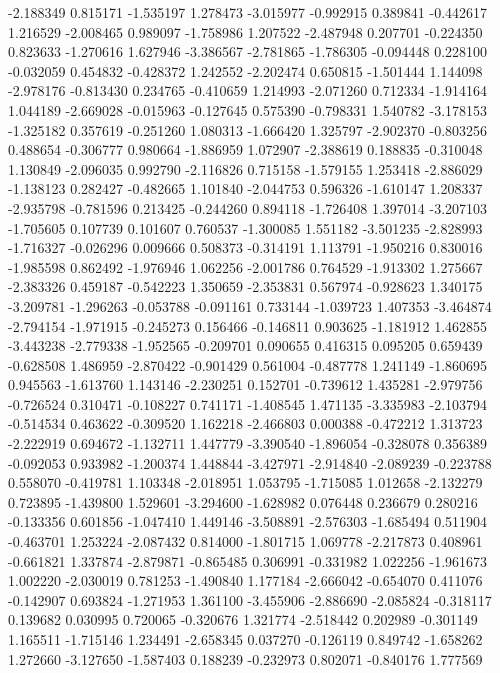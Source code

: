 -2.188349
0.815171
-1.535197
1.278473
-3.015977
-0.992915
0.389841
-0.442617
1.216529
-2.008465
0.989097
-1.758986
1.207522
-2.487948
0.207701
-0.224350
0.823633
-1.270616
1.627946
-3.386567
-2.781865
-1.786305
-0.094448
0.228100
-0.032059
0.454832
-0.428372
1.242552
-2.202474
0.650815
-1.501444
1.144098
-2.978176
-0.813430
0.234765
-0.410659
1.214993
-2.071260
0.712334
-1.914164
1.044189
-2.669028
-0.015963
-0.127645
0.575390
-0.798331
1.540782
-3.178153
-1.325182
0.357619
-0.251260
1.080313
-1.666420
1.325797
-2.902370
-0.803256
0.488654
-0.306777
0.980664
-1.886959
1.072907
-2.388619
0.188835
-0.310048
1.130849
-2.096035
0.992790
-2.116826
0.715158
-1.579155
1.253418
-2.886029
-1.138123
0.282427
-0.482665
1.101840
-2.044753
0.596326
-1.610147
1.208337
-2.935798
-0.781596
0.213425
-0.244260
0.894118
-1.726408
1.397014
-3.207103
-1.705605
0.107739
0.101607
0.760537
-1.300085
1.551182
-3.501235
-2.828993
-1.716327
-0.026296
0.009666
0.508373
-0.314191
1.113791
-1.950216
0.830016
-1.985598
0.862492
-1.976946
1.062256
-2.001786
0.764529
-1.913302
1.275667
-2.383326
0.459187
-0.542223
1.350659
-2.353831
0.567974
-0.928623
1.340175
-3.209781
-1.296263
-0.053788
-0.091161
0.733144
-1.039723
1.407353
-3.464874
-2.794154
-1.971915
-0.245273
0.156466
-0.146811
0.903625
-1.181912
1.462855
-3.443238
-2.779338
-1.952565
-0.209701
0.090655
0.416315
0.095205
0.659439
-0.628508
1.486959
-2.870422
-0.901429
0.561004
-0.487778
1.241149
-1.860695
0.945563
-1.613760
1.143146
-2.230251
0.152701
-0.739612
1.435281
-2.979756
-0.726524
0.310471
-0.108227
0.741171
-1.408545
1.471135
-3.335983
-2.103794
-0.514534
0.463622
-0.309520
1.162218
-2.466803
0.000388
-0.472212
1.313723
-2.222919
0.694672
-1.132711
1.447779
-3.390540
-1.896054
-0.328078
0.356389
-0.092053
0.933982
-1.200374
1.448844
-3.427971
-2.914840
-2.089239
-0.223788
0.558070
-0.419781
1.103348
-2.018951
1.053795
-1.715085
1.012658
-2.132279
0.723895
-1.439800
1.529601
-3.294600
-1.628982
0.076448
0.236679
0.280216
-0.133356
0.601856
-1.047410
1.449146
-3.508891
-2.576303
-1.685494
0.511904
-0.463701
1.253224
-2.087432
0.814000
-1.801715
1.069778
-2.217873
0.408961
-0.661821
1.337874
-2.879871
-0.865485
0.306991
-0.331982
1.022256
-1.961673
1.002220
-2.030019
0.781253
-1.490840
1.177184
-2.666042
-0.654070
0.411076
-0.142907
0.693824
-1.271953
1.361100
-3.455906
-2.886690
-2.085824
-0.318117
0.139682
0.030995
0.720065
-0.320676
1.321774
-2.518442
0.202989
-0.301149
1.165511
-1.715146
1.234491
-2.658345
0.037270
-0.126119
0.849742
-1.658262
1.272660
-3.127650
-1.587403
0.188239
-0.232973
0.802071
-0.840176
1.777569
